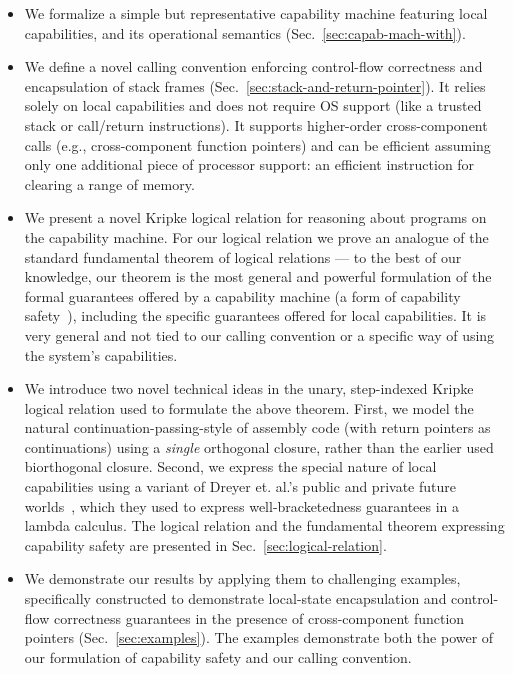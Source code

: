 \documentclass{llncs}
\newcommand{\sectionname}{Sec.}
\newcommand\lau[1]{{\color{purple} \sf \footnotesize {LS: #1}}\\}
\renewcommand\lau[1]{}
\begin{document}
\begin{itemize}
\item We formalize a simple but representative capability machine featuring local
  capabilities, and its operational semantics
  (\sectionname~\ref{sec:capab-mach-with}).
\item We define a novel calling convention enforcing control-flow correctness and
  encapsulation of stack frames (\sectionname~\ref{sec:stack-and-return-pointer}). It
  relies solely on local capabilities and does not require OS support (like a
  trusted stack or call/return instructions).
  It supports higher-order cross-component calls (e.g., cross-component function
  pointers) and can be efficient assuming only one additional piece of processor
  support: an efficient instruction for clearing a range of memory.
\item We present a novel Kripke logical relation for reasoning about programs on the
  capability machine. For our logical relation we prove an analogue of
  the standard fundamental theorem of logical relations --- to the
  best of our knowledge, our theorem
  is %
  the most general and powerful formulation of the formal guarantees offered by a
  capability machine (a form of capability
  safety~\cite{Devriese:2016ObjCap,Maffeis2010OC}), including the specific
  guarantees offered for local capabilities. It is very general and not tied to
  our calling convention or a specific way of using the system's capabilities.
\item We introduce two novel technical ideas in the unary, step-indexed Kripke
  logical relation used to formulate the above theorem. First, we model the
  natural continuation-passing-style of assembly code (with return pointers as
  continuations) using a \emph{single} orthogonal closure, rather than
  the earlier used biorthogonal closure. Second, we express the special nature of
  local capabilities using a variant of Dreyer et. al.'s public and private
  future worlds~\cite{Dreyer:jfp12}, which they used to express well-bracketedness
  guarantees in a lambda calculus. The logical relation and the
  fundamental theorem expressing capability safety
  are presented in \sectionname~\ref{sec:logical-relation}.
\item We demonstrate our results by applying them to challenging examples,
  specifically constructed to demonstrate local-state encapsulation and
  control-flow correctness guarantees in the presence of cross-component
  function pointers (\sectionname~\ref{sec:examples}). The examples demonstrate both
  the power of our formulation of capability safety and our calling convention.
\end{itemize}
\end{document}
